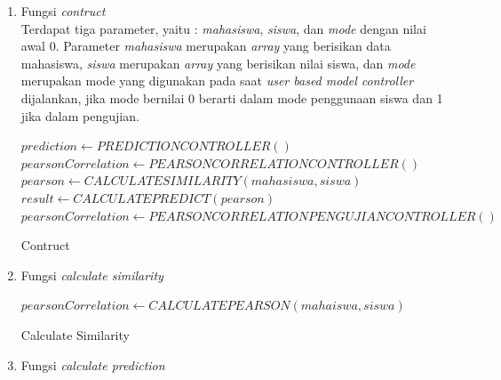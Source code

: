 \begin{enumerate}
    \item Fungsi \textit{contruct} \\
        
        Terdapat tiga parameter, yaitu : \textit{mahasiswa}, \textit{siswa}, dan \textit{mode} dengan nilai awal 0. Parameter \textit{mahasiswa} merupakan \textit{array} yang berisikan data mahasiswa, \textit{siswa} merupakan \textit{array} yang berisikan nilai siswa, dan \textit{mode} merupakan mode yang digunakan pada saat \textit{user based model controller} dijalankan, jika mode bernilai 0 berarti dalam mode penggunaan siswa dan 1 jika dalam pengujian. \\ 
        
        \begin{algorithm}[H]
            \begin{algorithmic}[1]
                    \State $prediction \gets PREDICTIONCONTROLLER()$
                        \State $pearsonCorrelation \gets PEARSONCORRELATIONCONTROLLER()$
                        \State $pearson \gets CALCULATESIMILARITY (mahasiswa, siswa)$
                        \State $result \gets CALCULATEPREDICT(pearson)$
                        \State $pearsonCorrelation \gets PEARSONCORRELATIONPENGUJIANCONTROLLER()$
                    \EndIf
                \EndProcedure
            \end{algorithmic} 
            \caption{Contruct}
            \label{alg:Contruct user-based}
        \end{algorithm}

    \item Fungsi \textit{calculate similarity}\\
    
        \begin{algorithm}[H]
            \begin{algorithmic}[1]
                    \State \Return $pearsonCorrelation \gets CALCULATEPEARSON(mahaiswa, siswa)$
                \EndProcedure
            \end{algorithmic} 
            \caption{Calculate Similarity}
            \label{alg:calculateSimilarity}
        \end{algorithm}
    
    \item Fungsi \textit{calculate prediction}\\
        

\end{enumerate}
